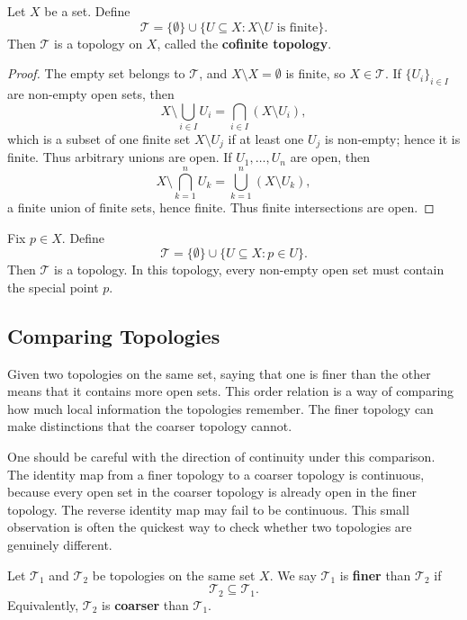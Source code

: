 \begin{example}
Let $X$ be a set. Define
\[
    \mathcal{T}=\{\emptyset\}\cup\{U\subseteq X:X\setminus U\text{ is finite}\}.
\]
Then $\mathcal{T}$ is a topology on $X$, called the \textbf{cofinite topology}.
\end{example}

\begin{proof}
The empty set belongs to $\mathcal{T}$, and $X\setminus X=\emptyset$ is finite, so $X\in\mathcal{T}$. If $\{U_i\}_{i\in I}$ are non-empty open sets, then
\[
    X\setminus\bigcup_{i\in I}U_i=\bigcap_{i\in I}(X\setminus U_i),
\]
which is a subset of one finite set $X\setminus U_j$ if at least one $U_j$ is non-empty; hence it is finite. Thus arbitrary unions are open. If $U_1,\dots,U_n$ are open, then
\[
    X\setminus\bigcap_{k=1}^nU_k=\bigcup_{k=1}^n(X\setminus U_k),
\]
a finite union of finite sets, hence finite. Thus finite intersections are open.
\end{proof}

\begin{example}
Fix $p\in X$. Define
\[
    \mathcal{T}=\{\emptyset\}\cup\{U\subseteq X:p\in U\}.
\]
Then $\mathcal{T}$ is a topology. In this topology, every non-empty open set must contain the special point $p$.
\end{example}

\subsection{Comparing Topologies}


Given two topologies on the same set, saying that one is finer than the other means that it contains more open sets. This order relation is a way of comparing how much local information the topologies remember. The finer topology can make distinctions that the coarser topology cannot.

One should be careful with the direction of continuity under this comparison. The identity map from a finer topology to a coarser topology is continuous, because every open set in the coarser topology is already open in the finer topology. The reverse identity map may fail to be continuous. This small observation is often the quickest way to check whether two topologies are genuinely different.

\begin{definition}
Let $\mathcal{T}_1$ and $\mathcal{T}_2$ be topologies on the same set $X$. We say $\mathcal{T}_1$ is \textbf{finer} than $\mathcal{T}_2$ if
\[
    \mathcal{T}_2\subseteq\mathcal{T}_1.
\]
Equivalently, $\mathcal{T}_2$ is \textbf{coarser} than $\mathcal{T}_1$.
\end{definition}

